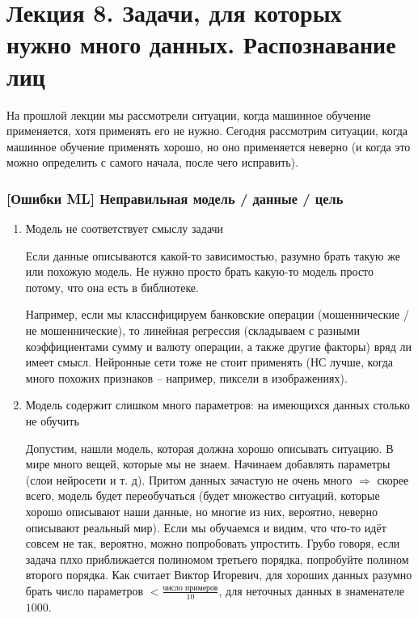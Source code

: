 \documentclass[main.tex]{subfiles}
\begin{document}
\section{Лекция 8. Задачи, для которых нужно много данных. Распознавание лиц }

На прошлой лекции мы рассмотрели ситуации, когда машинное обучение применяется, хотя применять его не нужно.
Сегодня рассмотрим ситуации, когда машинное обучение применять хорошо, но оно применяется неверно (и когда это можно определить с самого начала, после чего исправить).

\subsubsection{[Ошибки ML] Неправильная модель / данные / цель }

\begin{enumerate}[noitemsep]
	\item Модель не соответствует смыслу задачи
	
	Если данные описываются какой-то зависимостью, разумно брать такую же или похожую модель.
	Не нужно просто брать какую-то модель просто потому, что она есть в библиотеке.
	
	Например, если мы классифицируем банковские операции (мошеннические / не мошеннические), то линейная регрессия (складываем с разными коэффициентами сумму и валюту операции, а также другие факторы) вряд ли имеет смысл.
	Нейронные сети тоже не стоит применять (НС лучше, когда много похожих признаков -- например, пиксели в изображениях).
	
	\item Модель содержит слишком много параметров: на имеющихся данных столько не обучить
	
	Допустим, нашли модель, которая должна хорошо описывать ситуацию.
	В мире много вещей, которые мы не знаем.
	Начинаем добавлять параметры (слои нейросети и т. д).
	Притом данных зачастую не очень много $ \Rightarrow $ скорее всего, модель будет переобучаться (будет множество ситуаций, которые хорошо описывают наши данные, но многие из них, вероятно, неверно описывают реальный мир).
	Если мы обучаемся и видим, что что-то идёт совсем не так, вероятно, можно попробовать упростить.
	Грубо говоря, если задача плхо приближается полиномом третьего порядка, попробуйте полином второго порядка.
	Как считает Виктор Игоревич, для хороших данных разумно брать число параметров $ < \frac{\text{число примеров}}{10} $,
	для неточных данных в знаменателе $ 1000 $.
	

\end{enumerate}
\end{document}
